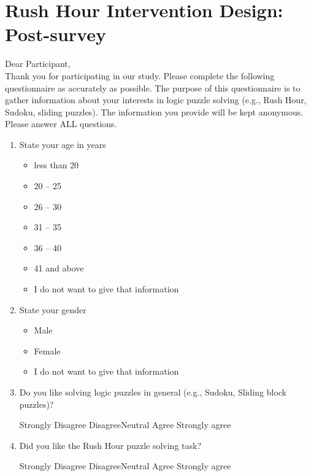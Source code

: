 \chapter{Rush Hour Intervention Design: Post-survey}
\label{apx:rushpre}
Dear Participant,\\
Thank you for participating in our study. Please complete the following questionnaire as accurately as possible. The purpose of this questionnaire is to gather information about your interests in logic puzzle solving (e.g., Rush Hour, Sudoku, sliding puzzles). The information you provide will be kept anonymous. \\
Please answer ALL questions.

\begin{enumerate}[topsep=-4em]
\item State your age in years
\begin{itemize}[topsep=-6em, label={o}]
\itemsep-1em 
\item less than 20
\item 20 -- 25
\item 26 -- 30
\item 31 -- 35
\item 36 -- 40
\item 41 and above
\item I do not want to give that information
\end{itemize}
\item State your gender
\begin{itemize}[topsep=-6em, label={o}]
\itemsep-1em 
\item Male
\item Female
\item I do not want to give that information
\end{itemize}
\item Do you like solving logic puzzles in general (e.g., Sudoku, Sliding block puzzles)?
\par Strongly Disagree \hspace{1cm} Disagree\hspace{1cm}Neutral\hspace{1cm} Agree\hspace{1cm} Strongly agree
\item Did you like the Rush Hour puzzle solving task?
\par Strongly Disagree \hspace{1cm} Disagree\hspace{1cm}Neutral\hspace{1cm} Agree\hspace{1cm} Strongly agree

\end{enumerate}
